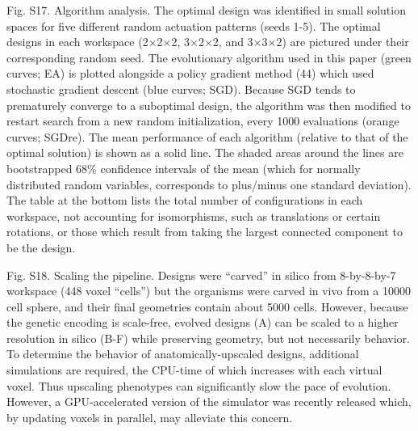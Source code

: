 Fig. S17. Algorithm analysis. The optimal design was identified in small solution spaces for five different random actuation patterns (seeds 1-5). The optimal designs in each workspace (2{$\times$}2{$\times$}2, 3{$\times$}2{$\times$}2, and 3{$\times$}3{$\times$}2) are pictured under their corresponding random seed. The evolutionary algorithm used in this paper (green curves; EA) is plotted alongside a policy gradient method (44) which used stochastic gradient descent (blue curves; SGD). Because SGD tends to prematurely converge to a suboptimal design, the algorithm was then modified to restart search from a new random initialization, every 1000 evaluations (orange curves; SGDre). The mean performance of each algorithm (relative to that of the optimal solution) is shown as a solid line. The shaded areas around the lines are bootstrapped 68\% confidence intervals of the mean (which for normally distributed random variables, corresponds to plus/minus one standard deviation). The table at the bottom lists the total number of configurations in each workspace, not accounting for isomorphisms, such as translations or certain rotations, or those which result from taking the largest connected component to be the design.




Fig. S18.  Scaling the pipeline. Designs were ``carved'' in silico from 8-by-8-by-7 workspace (448 voxel ``cells'') but the organisms were carved in vivo from a 10000 cell sphere, and their final geometries contain about 5000 cells. However, because the genetic encoding is scale-free, evolved designs (A) can be scaled to a higher resolution in silico (B-F) while preserving geometry, but not necessarily behavior. To determine the behavior of anatomically-upscaled designs, additional simulations are required, the CPU-time of which increases with each virtual voxel. Thus upscaling phenotypes can significantly slow the pace of evolution. However, a GPU-accelerated version of the simulator was recently released which, by updating voxels in parallel, may alleviate this concern. 

